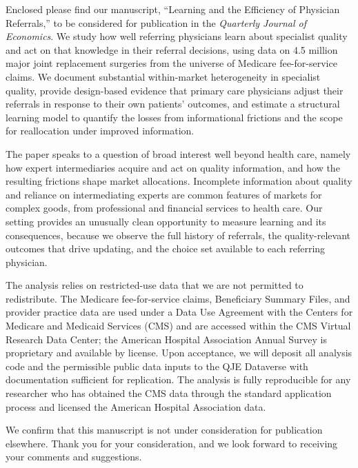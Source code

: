 \documentclass{article}
\begin{document}
Enclosed please find our manuscript, ``Learning and the Efficiency of Physician Referrals,'' to be considered for publication in the \textit{Quarterly Journal of Economics}. We study how well referring physicians learn about specialist quality and act on that knowledge in their referral decisions, using data on 4.5 million major joint replacement surgeries from the universe of Medicare fee-for-service claims. We document substantial within-market heterogeneity in specialist quality, provide design-based evidence that primary care physicians adjust their referrals in response to their own patients' outcomes, and estimate a structural learning model to quantify the losses from informational frictions and the scope for reallocation under improved information.

The paper speaks to a question of broad interest well beyond health care, namely how expert intermediaries acquire and act on quality information, and how the resulting frictions shape market allocations. Incomplete information about quality and reliance on intermediating experts are common features of markets for complex goods, from professional and financial services to health care. Our setting provides an unusually clean opportunity to measure learning and its consequences, because we observe the full history of referrals, the quality-relevant outcomes that drive updating, and the choice set available to each referring physician.

The analysis relies on restricted-use data that we are not permitted to redistribute. The Medicare fee-for-service claims, Beneficiary Summary Files, and provider practice data are used under a Data Use Agreement with the Centers for Medicare and Medicaid Services (CMS) and are accessed within the CMS Virtual Research Data Center; the American Hospital Association Annual Survey is proprietary and available by license. Upon acceptance, we will deposit all analysis code and the permissible public data inputs to the QJE Dataverse with documentation sufficient for replication. The analysis is fully reproducible for any researcher who has obtained the CMS data through the standard application process and licensed the American Hospital Association data.

We confirm that this manuscript is not under consideration for publication elsewhere. Thank you for your consideration, and we look forward to receiving your comments and suggestions.
\end{document}
